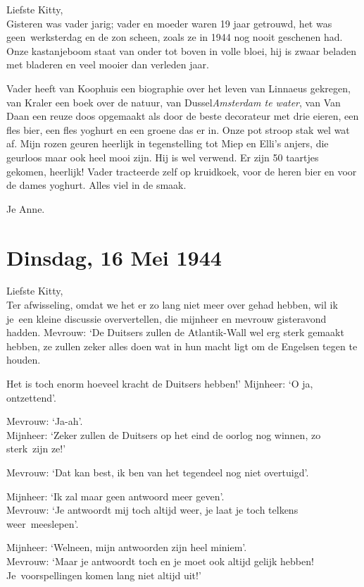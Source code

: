 \documentclass{book}
\begin{document}
Liefste Kitty,\\
Gisteren was vader jarig; vader en moeder waren 19 jaar
getrouwd, het was geen~werksterdag en de zon scheen, zoals ze in 1944 nog nooit
geschenen had. Onze kastanjeboom staat van onder tot boven in volle bloei, hij
is zwaar beladen met bladeren en veel mooier dan verleden jaar.

Vader heeft van Koophuis een biographie over het leven van Linnaeus gekregen,
van Kraler een boek over de natuur, van Dussel\emph{Amsterdam te water}, van Van
Daan een reuze doos opgemaakt als door de beste decorateur met drie eieren, een
fles bier, een fles yoghurt en een groene das er in. Onze pot stroop stak wel
wat af. Mijn rozen geuren heerlijk in tegenstelling tot Miep en Elli's anjers,
die geurloos maar ook heel mooi zijn. Hij is wel verwend. Er zijn 50 taartjes
gekomen, heerlijk!  Vader tracteerde zelf op kruidkoek, voor de heren bier en
voor de dames yoghurt. Alles viel in de smaak.

Je Anne.

\section*{Dinsdag, 16 Mei 1944}

Liefste Kitty,\\
Ter afwisseling, omdat we het er zo lang niet meer over gehad
hebben, wil ik je~een kleine discussie oververtellen, die mijnheer en mevrouw
gisteravond hadden. Mevrouw: `De Duitsers zullen de Atlantik-Wall wel erg sterk
gemaakt hebben, ze zullen zeker alles doen wat in hun macht ligt om de Engelsen
tegen te houden.

Het is toch enorm hoeveel kracht de Duitsers hebben!' Mijnheer: `O ja,
ontzettend'.

Mevrouw: `Ja-ah'.\\
Mijnheer: `Zeker zullen de Duitsers op het eind de oorlog
nog winnen, zo sterk~zijn ze!'

Mevrouw: `Dat kan best, ik ben van het tegendeel nog niet overtuigd'.~

Mijnheer: `Ik zal maar geen antwoord meer geven'.\\
Mevrouw: `Je antwoordt mij
toch altijd weer, je laat je toch telkens weer~meeslepen'.

Mijnheer: `Welneen, mijn antwoorden zijn heel miniem'.\\
Mevrouw: `Maar je
antwoordt toch en je moet ook altijd gelijk hebben! Je~voorspellingen komen lang
niet altijd uit!'
\end{document}
